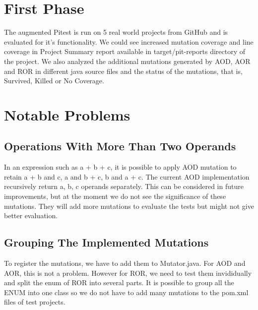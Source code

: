 \section{First Phase}






The augmented Pitest is run on 5 real world projects from GitHub and is evaluated for it's functionality. We could see increased mutation coverage and line coverage in Project Summary report available in target/pit-reports directory of the project. We also analyzed the additional mutations generated by AOD, AOR and ROR in different java source files and the status of the mutations, that is, Survived, Killed or No Coverage.

\section{Notable Problems}
\subsection{Operations With More Than Two Operands}
In an expression such as a + b + c, it is possible to apply AOD mutation to retain a + b and c, a and b + c, b and a + c. The current AOD implementation recursively return a, b, c operands separately. This can be considered in future improvements, but at the moment we do not see the significance of these mutations. They will add more mutations to evaluate the tests but might not give better evaluation. 

\subsection{Grouping The Implemented Mutations}
To register the mutations, we have to add them to Mutator.java. For AOD and AOR, this is not a problem. However for ROR, we need to test them invididually and split the enum of ROR into several parts. It is possible to group all the ENUM into one class so we do not have to add many mutations to the pom.xml files of test projects.

